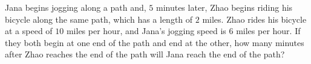 Jana begins jogging along a path and, $5$ minutes later, Zhao begins riding his bicycle along the same path, which has a length of $2$ miles. Zhao rides his bicycle at a speed of $10$ miles per hour, and Jana's jogging speed is $6$ miles per hour. If they both begin at one end of the path and end at the other, how many minutes after Zhao reaches the end of the path will Jana reach the end of the path?
